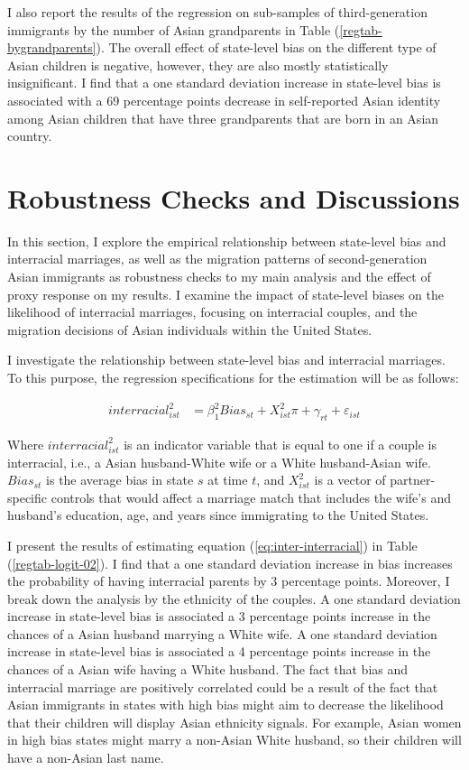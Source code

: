 I also report the results of the regression on sub-samples of third-generation immigrants by the number of Asian grandparents in Table (\ref{regtab-bygrandparents}). The overall effect of state-level bias on the different type of Asian children is negative, however, they are also mostly statistically insignificant. I find that a one standard deviation increase in state-level bias is associated with a 69 percentage points decrease in self-reported Asian identity among Asian children that have three grandparents that are born in an Asian country.

\section{Robustness Checks and Discussions} %
\label{sec:robcheck}

In this section, I explore the empirical relationship between state-level bias and interracial marriages, as well as the migration patterns of second-generation Asian immigrants as robustness checks to my main analysis and the effect of proxy response on my results. I examine the impact of state-level biases on the likelihood of interracial marriages, focusing on interracial couples, and the migration decisions of Asian individuals within the United States. 

I investigate the relationship between state-level bias and interracial marriages. To this purpose, the regression specifications for the estimation will be as follows:

\begin{align}
interracial_{ist}^2 &= \beta_1^2 Bias_{st} + X_{ist}^2\pi + \gamma_{rt} 
            + \varepsilon_{ist}  \label{eq:inter-interracial} 
\end{align}

Where $interracial_{ist}^2$ is an indicator variable that is equal to one if a couple is interracial, i.e., a Asian husband-White wife or a White husband-Asian wife. $Bias_{st}$ is the average bias in state $s$ at time $t$, and $X_{ist}^2$ is a vector of partner-specific controls that would affect a marriage match that includes the wife's and husband's education, age, and years since immigrating to the United States. 

I present the results of estimating equation (\ref{eq:inter-interracial}) in Table (\ref{regtab-logit-02}). I find that a one standard deviation increase in bias increases the probability of having interracial parents by 3 percentage points. Moreover, I break down the analysis by the ethnicity of the couples. A one standard deviation increase in state-level bias is associated a 3 percentage points increase in the chances of a Asian husband marrying a White wife. A one standard deviation increase in state-level bias is associated a 4 percentage points increase in the chances of a Asian wife having a White husband. The fact that bias and interracial marriage are positively correlated could be a result of the fact that Asian immigrants in states with high bias might aim to decrease the likelihood that their children will display Asian ethnicity signals. For example, Asian women in high bias states might marry a non-Asian White husband, so their children will have a non-Asian last name.

